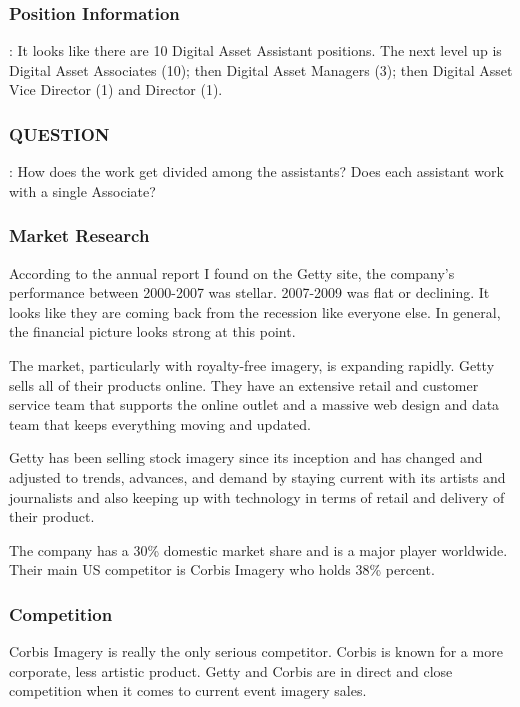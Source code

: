 \subsubsection*{Position Information}: It looks like there are 10 Digital Asset Assistant positions. The next level up is Digital Asset Associates (10); then Digital Asset Managers (3); then Digital Asset Vice Director (1) and Director (1).

\subsubsection*{QUESTION}: How does the work get divided among the assistants? Does each assistant work with a single Associate?

\subsubsection*{Market Research}

According to the annual report I found on the Getty site, the company's performance between 2000-2007 was stellar. 2007-2009 was flat or declining. It looks like they are coming back from the recession like everyone else. In general, the financial picture looks strong at this point.

The market, particularly with royalty-free imagery, is expanding rapidly.
Getty sells all of their products online. They have an extensive retail and customer service team that supports the online outlet and a massive web design and data team that keeps everything moving and updated.

Getty has been selling stock imagery since its inception and has changed and adjusted to trends, advances, and demand by staying current with its artists and journalists and also keeping up with technology in terms of retail and delivery of their product.

The company has a 30\% domestic market share and is a major player worldwide. Their main US competitor is Corbis Imagery who holds 38\% percent.

\subsubsection*{Competition}

Corbis Imagery is really the only serious competitor. Corbis is known for a more corporate, less artistic product. Getty and Corbis are in direct and close competition when it comes to current event imagery sales.


